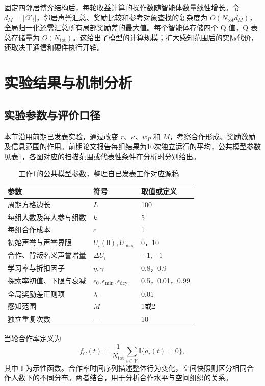 固定四邻居博弈结构后，每轮收益计算的操作数随智能体数量线性增长。令 $d_M=|\Omega'_i|$，邻居声誉汇总、奖励比较和参考对象查找的复杂度为 $O(N_{\mathrm{tot}}d_M)$，全局归一化还需汇总所有局部奖励差的最大值。每个智能体存储四个 Q 值，Q 表总存储量为 $O(N_{\mathrm{tot}})$。这给出了模型的计算规模；扩大感知范围后的实际代价，还取决于通信和硬件执行开销。

\section{实验结果与机制分析}
\subsection{实验参数与评价口径}

本节沿用前期已发表实验，通过改变 $r$、$\kappa$、$w_P$ 和 $M$，考察合作形成、奖励激励及信息范围的作用。前期论文报告每组结果为10次独立运行的平均\cite{kang2025neighbor}，公共模型参数见表\ref{tab:w1-settings}，各图对应的扫描范围或代表性条件在分析时分别给出。

\begin{table}[htbp]
 \centering
 \caption{工作1的公共模型参数，整理自已发表工作对应源稿}
 \label{tab:w1-settings}
 \begin{tabular}{lll}
 \toprule
 参数 & 符号 & 取值或定义\\
 \midrule
 周期方格边长 & $L$ & 100\\
 每组人数及每人参与组数 & $k$ & 5\\
 每组合作成本 & $c$ & 1\\
 初始声誉与声誉界限 & $U_i(0),U_{\max}$ & 0，10\\
 合作、背叛名义声誉增量 & $\Delta U_i$ & $+1,-1$\\
 学习率与折扣因子 & $\eta,\gamma$ & 0.8，0.9\\
 探索率初值、下限与衰减 & $\epsilon_0,\epsilon_{\min},\epsilon_{\mathrm{dcy}}$ & 0.5，0.01，0.99\\
 全局奖励差正则项 & $\lambda_\epsilon$ & 0.01\\
 感知范围 & $M$ & 1或2\\
 独立重复次数 & --- & 10\\
 \bottomrule
 \end{tabular}
\par{}
\end{table}

当轮合作率定义为
\begin{equation}
 f_C(t)=\frac{1}{N_{\mathrm{tot}}}\sum_{i\in\mathcal V}\mathbb I\{a_i(t)=0\},
 \label{eq:w1-cooperation}
\end{equation}
其中 $\mathbb I$ 为示性函数。合作率时间序列描述整体行为变化，空间快照则区分相同合作人数下的不同分布。两者结合，用于分析合作水平与空间组织的关系。

